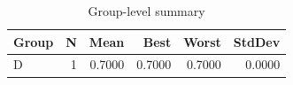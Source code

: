 \begin{table}[htbp]
\centering
\caption{Group-level summary}
\label{tab:group-summary}
\begin{tabular}{lrrrrr}
\toprule
\textbf{Group} & \textbf{N} & \textbf{Mean} & \textbf{Best} & \textbf{Worst} & \textbf{StdDev} \\
\midrule
D & 1 & 0.7000 & 0.7000 & 0.7000 & 0.0000 \\
\bottomrule
\end{tabular}
\end{table}